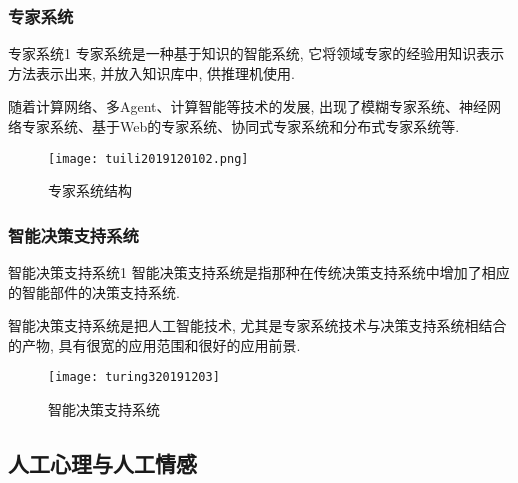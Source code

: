 \subsubsection{专家系统}
\begin{mydef}{专家系统}{1}
专家系统是一种基于知识的智能系统, 它将领域专家的经验用知识表示方法表示出来, 并放入知识库中, 供推理机使用.
\end{mydef}

随着计算网络、多Agent、计算智能等技术的发展, 出现了模糊专家系统、神经网络专家系统、基于Web的专家系统、协同式专家系统和分布式专家系统等.
\begin{figure}[htbp]
	\centering
	\texttt{[image: tuili2019120102.png]}
	\caption{专家系统结构}
   \label{AI:Fig4}
\end{figure}
\subsubsection{智能决策支持系统}
\begin{mydef}{智能决策支持系统}{1}
智能决策支持系统是指那种在传统决策支持系统中增加了相应的智能部件的决策支持系统.
\end{mydef}

智能决策支持系统是把人工智能技术, 尤其是专家系统技术与决策支持系统相结合的产物, 具有很宽的应用范围和很好的应用前景.
\begin{figure}[htbp]
	\centering
	\texttt{[image: turing320191203]}
	\caption{智能决策支持系统}
   \label{AI:Fig4}
\end{figure}
\subsection{人工心理与人工情感}
